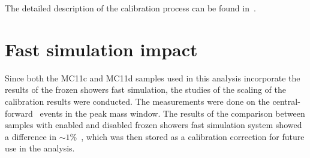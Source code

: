 The detailed description of the calibration process can be found in~\cite{lib:calib}.

\section{Fast simulation impact}

Since both the MC11c and MC11d samples used in this analysis incorporate the results of the frozen showers fast simulation, the studies of the scaling of the calibration results were conducted. The measurements were done on the central-forward \Zee\ events in the peak mass window. The results of the comparison between samples with enabled and disabled frozen showers fast simulation system showed a difference in $\sim 1$\%~\cite{lib:calib_support}, which was then stored as a calibration correction for future use in the analysis.
